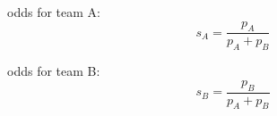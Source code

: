 \documentclass[12pt,a4paper]{book}
\author{Daniel Schulz}
\begin{document}
	
	odds for team A:
	\[
		s_A = \frac{p_A}{p_A + p_B}
	\]
	
	odds for team B:
	\[
		s_B = \frac{p_B}{p_A + p_B}
	\]
\end{document}
